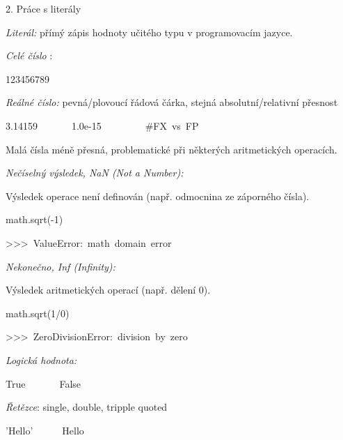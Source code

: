 \documentclass[czech]{beamer}
\newenvironment{lyxcode}
  {\par\begin{list}{}{
    \setlength{\rightmargin}{\leftmargin}
    \setlength{\listparindent}{0pt}%
    \raggedright
    \setlength{\itemsep}{0pt}
    \setlength{\parsep}{0pt}
    \normalfont\ttfamily}%
   \def\{{\char`\{}
   \def\}{\char`\}}
   \def\textasciitilde{\char`\~}
   \item[]}
  {\end{list}}
\begin{document}
\begin{frame}[plain]{2. Práce s literály}

{\scriptsize\emph{Literál: }}{\scriptsize přímý zápis hodnoty učitého
typu v programovacím jazyce.\medskip{}
}{\scriptsize\par}

{\scriptsize\emph{Celé číslo}}{\scriptsize{} :}{\scriptsize\par}
\begin{lyxcode}
{\scriptsize 123456789}{\scriptsize\par}
\end{lyxcode}
{\scriptsize\emph{Reálné číslo: }}{\scriptsize pevná/plovoucí řádová
čárka, stejná absolutní/relativní přesnost}{\scriptsize\par}
\begin{lyxcode}
{\scriptsize 3.14159~~~~~~~1.0e-15~~~~~~~~~\#FX~vs~FP}{\scriptsize\par}
\end{lyxcode}
{\scriptsize Malá čísla méně přesná, problematické při některých aritmetických
operacích.\medskip{}
}{\scriptsize\par}

{\scriptsize\emph{Nečíselný výsledek, NaN (Not a Number):}}{\scriptsize\par}

{\scriptsize Výsledek operace není definován (např. odmocnina ze záporného
čísla).}{\scriptsize\par}
\begin{lyxcode}
{\scriptsize math.sqrt(-1)~}{\scriptsize\par}

{\scriptsize >\textcompwordmark >\textcompwordmark >~ValueError:~math~domain~error}{\scriptsize\par}
\end{lyxcode}
{\scriptsize\emph{Nekonečno, Inf (Infinity):}}{\scriptsize\par}

{\scriptsize Výsledek aritmetických operací (např. dělení 0).}{\scriptsize\par}
\begin{lyxcode}
{\scriptsize math.sqrt(1/0)~}{\scriptsize\par}

{\scriptsize >\textcompwordmark >\textcompwordmark >~ZeroDivisionError:~division~by~zero}{\scriptsize\par}
\end{lyxcode}
{\scriptsize\emph{Logická hodnota:}}{\scriptsize\par}
\begin{lyxcode}
{\scriptsize True~~~~~~~False}{\scriptsize\par}
\end{lyxcode}
{\scriptsize\emph{Řetězce}}{\scriptsize : single, double, tripple quoted}{\scriptsize\par}
\begin{lyxcode}
{\scriptsize 'Hello'~~~~~~\textquotedbl Hello\textquotedbl ~~}{\scriptsize\par}


\end{lyxcode}
\end{frame}
\end{document}
